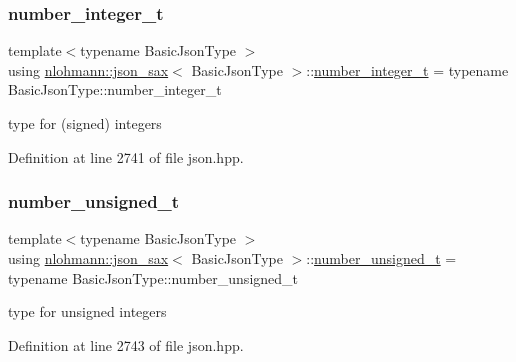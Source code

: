 \mbox{\label{structnlohmann_1_1json__sax_a0cef30121f02b7fee85e9708148ea0aa}} 
\subsubsection{\texorpdfstring{number\_integer\_t}{number\_integer\_t}}
{\footnotesize\ttfamily template$<$typename Basic\+Json\+Type $>$ \\
using \mbox{\hyperlink{structnlohmann_1_1json__sax}{nlohmann\+::json\+\_\+sax}}$<$ Basic\+Json\+Type $>$\+::\mbox{\hyperlink{structnlohmann_1_1json__sax_a0cef30121f02b7fee85e9708148ea0aa}{number\+\_\+integer\+\_\+t}} =  typename Basic\+Json\+Type\+::number\+\_\+integer\+\_\+t}



type for (signed) integers 



Definition at line 2741 of file json.\+hpp.

\mbox{\label{structnlohmann_1_1json__sax_a32028cc056ae0f43aaae331cdbbbf856}} 
\subsubsection{\texorpdfstring{number\_unsigned\_t}{number\_unsigned\_t}}
{\footnotesize\ttfamily template$<$typename Basic\+Json\+Type $>$ \\
using \mbox{\hyperlink{structnlohmann_1_1json__sax}{nlohmann\+::json\+\_\+sax}}$<$ Basic\+Json\+Type $>$\+::\mbox{\hyperlink{structnlohmann_1_1json__sax_a32028cc056ae0f43aaae331cdbbbf856}{number\+\_\+unsigned\+\_\+t}} =  typename Basic\+Json\+Type\+::number\+\_\+unsigned\+\_\+t}



type for unsigned integers 



Definition at line 2743 of file json.\+hpp.

